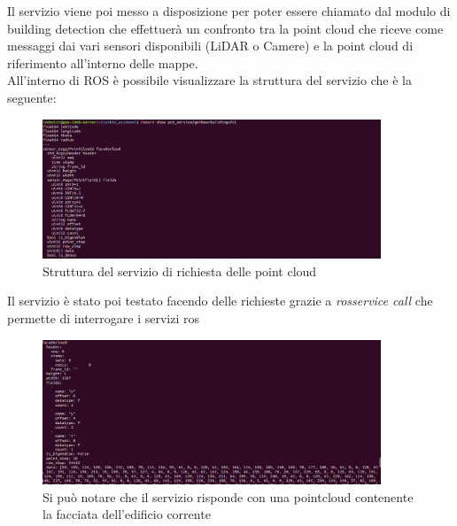 Il servizio viene poi messo a disposizione per poter essere chiamato dal modulo di building detection\cite{7795618} che effettuerà un confronto tra la point cloud che riceve come messaggi dai vari sensori disponibili (LiDAR o Camere) e la point cloud di riferimento all'interno delle mappe. \\
All'interno di ROS è possibile visualizzare la struttura del servizio che è la seguente:
\begin{figure}[H]
    \centering
    \includegraphics[width=0.9\textwidth]{Immagini/strutturamessaggio.png}
    \caption{Struttura del servizio di richiesta delle point cloud}
    \label{fig:QueryResult}
\end{figure}

Il servizio è stato poi testato facendo delle richieste grazie a \textit{rosservice call} che permette di interrogare i servizi ros
\begin{figure}[H]
    \centering
    \includegraphics[width=0.9\textwidth]{Immagini/RispostaAlServizio.png}
    \caption{Si può notare che il servizio risponde con una pointcloud contenente la facciata dell'edificio corrente}
    \label{fig:QueryResult}
\end{figure}